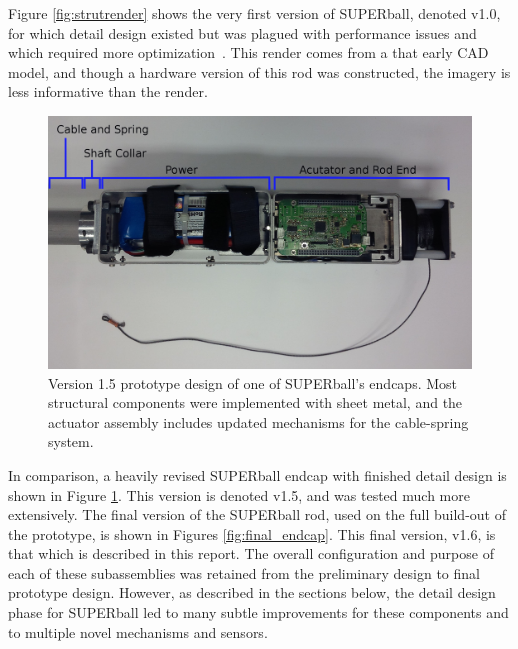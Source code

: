 \documentclass[12pt]{report}
\begin{document}
Figure \ref{fig:strutrender} shows the very first version of SUPERball, denoted v1.0, for which detail design existed but was plagued with performance issues and which required more optimization~\cite{bruce2014design}.
This render comes from a that early CAD model, and though a hardware version of this rod was constructed, the imagery is less informative than the render.


\begin{figure}[thpb]
      \centering
      \includegraphics[width=0.9\columnwidth]{img/subsystem_end-cap_cropped.jpg}
      \caption{Version 1.5 prototype design of one of SUPERball's endcaps. Most structural components were implemented with sheet metal, and the actuator assembly includes updated mechanisms for the cable-spring system.}
      \label{fig:strut_prototype}
      \vspace{-0.2cm}
\end{figure}

In comparison, a heavily revised SUPERball endcap with finished detail design is shown in Figure \ref{fig:strut_prototype}.
This version is denoted v1.5, and was tested much more extensively.
The final version of the SUPERball rod, used on the full build-out of the prototype, is shown in Figures \ref{fig:final_endcap}.
This final version, v1.6, is that which is described in this report.
The overall configuration and purpose of each of these subassemblies was retained from the preliminary design to final prototype design.
However, as described in the sections below, the detail design phase for SUPERball led to many subtle improvements for these components and to multiple novel mechanisms and sensors.
\end{document}

